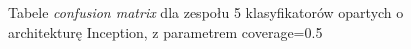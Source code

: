 \documentclass[polish,12pt]{aghthesis}
\begin{document}
\begin{figure}[h!]%
    \begin{adjustbox}{minipage=1.0\paperwidth, pagecenter}
    \centering
    \qquad
    \end{adjustbox}
    \label{fig:inc-ens-5-0.7-matrices}
    \caption{Tabele \textit{confusion matrix} dla zespołu 5 klasyfikatorów opartych o architekturę Inception, z parametrem coverage=0.5}
\end{figure}
\end{document}
